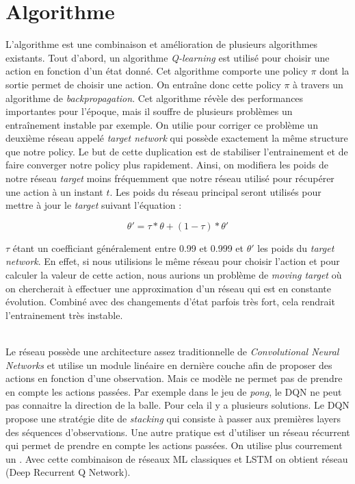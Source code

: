 \section{Algorithme}

L'algorithme  est une combinaison et amélioration de plusieurs algorithmes existants. Tout d'abord, un algorithme \textit{Q-learning} est utilisé pour choisir une action en fonction d'un état donné. Cet algorithme comporte une policy $\pi$ dont la sortie permet de choisir une action. On entraîne donc cette policy $\pi$ à travers un algorithme de \textit{backpropagation}. Cet algorithme révèle des performances importantes pour l'époque, mais il souffre de plusieurs problèmes un entraînement instable par exemple. On utilie pour corriger ce problème un deuxième réseau appelé \textit{target network} qui possède exactement la même structure que notre policy.  Le but de cette duplication est de stabiliser l'entrainement et de faire converger notre policy plus rapidement. Ainsi, on modifiera les poids de notre réseau \textit{target} moins fréquemment que notre réseau utilisé pour récupérer une action à un instant $t$. Les poids du réseau principal seront utilisés pour mettre à jour le \textit{target} suivant l'équation :

$$ {\theta'} = \tau * \theta + (1 - \tau) * \theta' $$

$\tau$ étant un coefficiant généralement entre 0.99 et 0.999 et $\theta'$ les poids du \textit{target network}. En effet, si nous utilisions le même réseau pour choisir l'action et pour calculer la valeur de cette action, nous aurions un problème de \textit{moving target} où on chercherait à effectuer une approximation d'un réseau qui est en constante évolution. Combiné avec des changements d'état parfois très fort, cela rendrait l'entrainement très instable.

~\\
Le réseau  possède une architecture assez traditionnelle de \textit{Convolutional Neural Networks} et utilise un module linéaire en dernière couche afin de proposer des actions en fonction d'une observation. Mais ce modèle ne permet pas de prendre en compte les actions passées. Par exemple dans le jeu de \textit{pong}, le DQN ne peut pas connaitre la direction de la balle. Pour cela il y a plusieurs solutions. Le DQN propose une stratégie dite de \textit{stacking} qui consiste à passer aux premières layers des séquences d'observations. Une autre pratique est d'utiliser un réseau récurrent  qui permet de prendre en compte les actions passées. On utilise plus courrement un . Avec cette combinaison de réseaux ML classiques et LSTM on obtient réseau  (Deep Recurrent Q Network).

